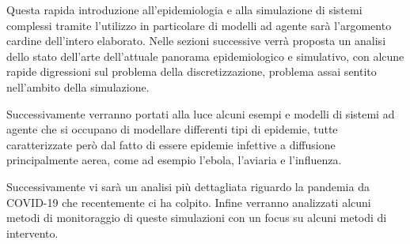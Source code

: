 Questa rapida introduzione all’epidemiologia e alla simulazione di sistemi complessi 
tramite l’utilizzo in particolare di modelli ad agente sarà l’argomento cardine dell’intero elaborato. 
Nelle sezioni successive verrà proposta un analisi dello stato dell’arte dell’attuale 
panorama epidemiologico e simulativo, con alcune rapide digressioni sul problema della discretizzazione, 
problema assai sentito nell’ambito della simulazione. 

Successivamente verranno portati alla luce alcuni esempi e modelli di sistemi ad agente 
che si occupano di modellare differenti tipi di epidemie, 
tutte caratterizzate però dal fatto di essere epidemie infettive a diffusione principalmente aerea, 
come ad esempio l’ebola, l’aviaria e l’influenza. 

Successivamente vi sarà un analisi più dettagliata riguardo la pandemia da COVID-19 
che recentemente ci ha colpito. Infine verranno analizzati alcuni metodi di monitoraggio 
di queste simulazioni con un focus su alcuni metodi di intervento.